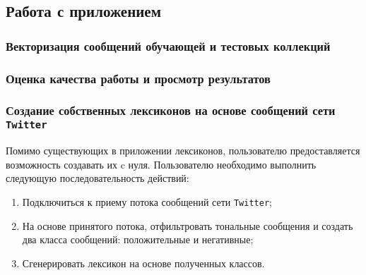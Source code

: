     \subsection{Работа с приложением}
        \subsubsection{Векторизация сообщений обучающей и тестовых коллекций}

        \subsubsection{Оценка качества работы и просмотр результатов}

        \subsubsection{Создание собственных лексиконов на основе сообщений сети
            {\tt Twitter} }
        Помимо существующих в приложении лексиконов, пользователю предоставляется
        возможность создавать их c нуля. Пользователю необходимо выполнить следующую
        последовательность действий:
        \begin{enumerate}
            \item Подключиться к приему потока сообщений сети {\tt Twitter};
            \item На основе принятого потока, отфильтровать тональные сообщения
            и создать два класса сообщений: положительные и негативные;
            \item Сгенерировать лексикон на основе полученных классов.
        \end{enumerate}


